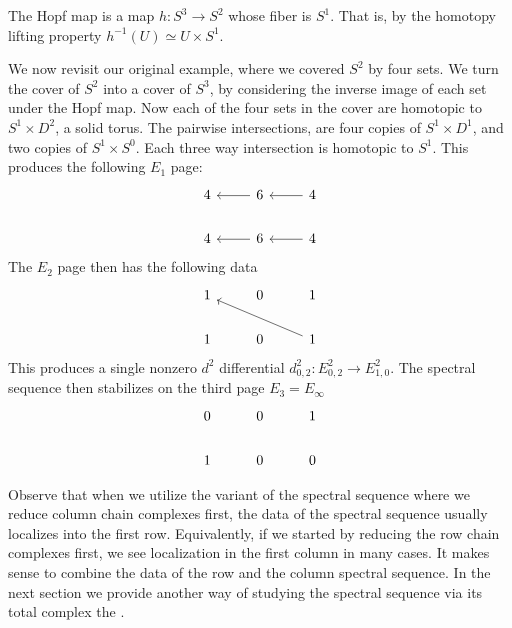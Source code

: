 The Hopf map is a map  $h: S^3 \rightarrow S^2$ whose fiber is $S^1$. That is, by the homotopy lifting property $h^{-1}(U) \simeq U \times S^1$. 
\begin{example}
We now revisit our original example, where we covered $S^2$ by four sets. We turn the cover of $S^2$ into a cover of $S^3$, by considering the inverse image of each set under the Hopf map. Now each of the four sets in the cover are homotopic to $S^1 \times D^2$, a solid torus. The pairwise intersections, are four copies of $S^1 \times D^1$, and two copies of $S^1 \times S^0$. Each three way intersection is homotopic to $S^1$.
This produces the following $E_1$ page:
\[ \begin{tikzcd}
4    &  \arrow{l} 6     & \arrow{l}   4   \\
4    & \arrow{l}  6     & \arrow{l}   4
\end{tikzcd} \]
The $E_2$ page then has the following data
\[
\begin{tikzcd}
1    &  0     &   1   \\
1   &  0     &   \arrow{llu}1
\end{tikzcd} 
\]
This produces a single nonzero $d^2$ differential $d^2_{0,2}: E^2_{0,2} \rightarrow E^2_{1,0}$.
The spectral sequence then stabilizes on the third page $E_3 = E_\infty$
\[
\begin{tikzcd}
0    &  0     &   1   \\
1   &  0     &    0
\end{tikzcd} 
\]
\end{example}

Observe that when we utilize the variant of the spectral sequence where we reduce column chain complexes first, the data of the spectral sequence usually localizes into the first row. Equivalently, if we started by reducing the row chain complexes first, we see localization in the first column in many cases. It makes sense to combine the data of the row and the column spectral sequence. In the next section we provide another way of studying the \mv spectral sequence via its total complex the \mvb. 